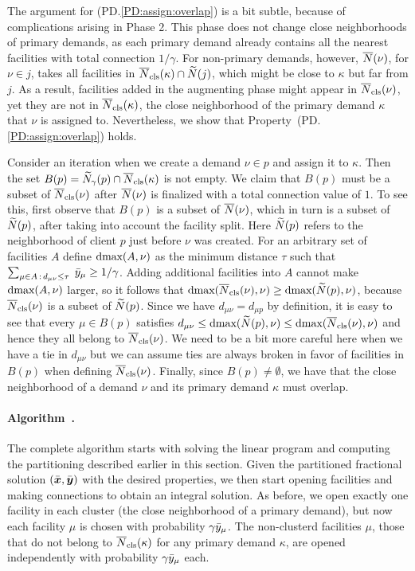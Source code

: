 \documentclass{llncs}
\begin{document}
The argument for (PD.\ref{PD:assign:overlap}) is a bit subtle, because
of complications arising in Phase 2.
This phase does not change close neighborhoods of primary demands, as
each primary demand already contains all the nearest facilities with
total connection  $1/\gamma$.  For non-primary demands, however,
${\overline{N}}(\nu)$, for $\nu\in j$, takes all facilities in
${\overline{N}}_{\text{cls}}(\kappa)\cap {\widetilde N}(j)$, which might be close to $\kappa$
but far from $j$.  As a result, facilities added in the
augmenting phase might appear in ${\overline{N}}_{\text{cls}}(\nu)$, yet they
are not in ${\overline{N}}_{\text{cls}}(\kappa)$, the close neighborhood of the primary
demand $\kappa$ that $\nu$ is assigned to.  Nevertheless, we show that
Property~(PD.\ref{PD:assign:overlap}) holds.

Consider an iteration when we create a demand $\nu\in p$
and assign it to $\kappa$. Then the set
$B(p)={\widetilde N}_{\gamma}(p)\cap {\overline{N}}_{\text{cls}}(\kappa)$ is not empty.
We claim that
$B(p)$ must be a subset of ${\overline{N}}_{\text{cls}}(\nu)$ after ${\overline{N}}(\nu)$ is
finalized with a total connection value of $1$. To see this, first
observe that $B(p)$ is a subset of ${\overline{N}}(\nu)$, which in turn is a
subset of ${\widetilde N}(p)$, after taking into account the facility
split. Here ${\widetilde N}(p)$ refers to the neighborhood of client $p$
just before $\nu$ was created. For an arbitrary set of facilities
$A$ define $\text{dmax}(A, \nu)$ as the minimum distance $\tau$ such
that $\sum_{\mu\in A {\,:\,} d_{\mu\nu} \leq \tau}\;{\bar y}_{\mu} \geq
1/\gamma$.
Adding additional facilities into $A$ cannot make
$\text{dmax}(A, \nu)$ larger, so it follows that $\text{dmax}({\overline{N}}_{\text{cls}}(\nu), \nu)
\geq \text{dmax}({\widetilde N}(p), \nu)$, because ${\overline{N}}_{\text{cls}}(\nu)$ is a subset of
${\widetilde N}(p)$. Since we have $d_{\mu \nu} = d_{\mu p}$ by definition,
it is easy to see that every $\mu \in B(p)$ satisfies $d_{\mu \nu}
\leq \text{dmax}({\widetilde N}(p), \nu) \leq \text{dmax}({\overline{N}}_{\text{cls}}(\nu), \nu)$ and
hence they all belong to ${\overline{N}}_{\text{cls}}(\nu)$. We need to be a bit more
careful here when we have a tie in $d_{\mu\nu}$ but we can assume ties
are always broken in favor of facilities in $B(p)$ when defining
${\overline{N}}_{\text{cls}}(\nu)$. Finally, since $B(p)\neq\emptyset$, we have that the
close neighborhood of a demand $\nu$ and its primary demand $\kappa$
must overlap.


\paragraph{Algorithm~{\EBGS}.}
The complete algorithm starts with solving the linear program and
computing the partitioning described earlier in this section.
Given the partitioned fractional solution $(\bar{\boldsymbol{x}},
\bar{\boldsymbol{y}})$ with the desired properties, we then start opening
facilities and making connections to obtain an integral
solution. As before, we open exactly one facility in each
cluster (the close neighborhood of a primary demand), but
now each facility $\mu$ is chosen with probability
$\gamma{\bar y}_{\mu}$. The non-clusterd facilities $\mu$,
those that do not belong to ${\overline{N}}_{\text{cls}}(\kappa)$ for any
primary demand $\kappa$, are opened independently with
probability $\gamma{\bar y}_{\mu}$ each. 
\end{document}
